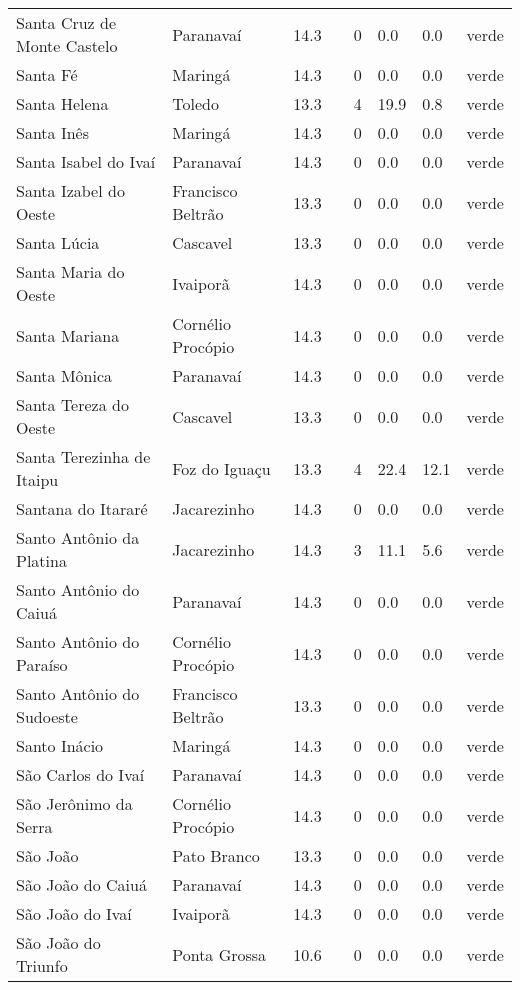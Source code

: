 \begin{longtable}{l|lllllll}
  Santa Cruz de Monte Castelo & Paranavaí & 14.3 &  & 0 & 0.0 & 0.0 & verde \\ 
  Santa Fé & Maringá & 14.3 &  & 0 & 0.0 & 0.0 & verde \\ 
  Santa Helena & Toledo & 13.3 &  & 4 & 19.9 & 0.8 & verde \\ 
  Santa Inês & Maringá & 14.3 &  & 0 & 0.0 & 0.0 & verde \\ 
  Santa Isabel do Ivaí & Paranavaí & 14.3 &  & 0 & 0.0 & 0.0 & verde \\ 
  Santa Izabel do Oeste & Francisco Beltrão & 13.3 &  & 0 & 0.0 & 0.0 & verde \\ 
  Santa Lúcia & Cascavel & 13.3 &  & 0 & 0.0 & 0.0 & verde \\ 
  Santa Maria do Oeste & Ivaiporã & 14.3 &  & 0 & 0.0 & 0.0 & verde \\ 
  Santa Mariana & Cornélio Procópio & 14.3 &  & 0 & 0.0 & 0.0 & verde \\ 
  Santa Mônica & Paranavaí & 14.3 &  & 0 & 0.0 & 0.0 & verde \\ 
  Santa Tereza do Oeste & Cascavel & 13.3 &  & 0 & 0.0 & 0.0 & verde \\ 
  Santa Terezinha de Itaipu & Foz do Iguaçu & 13.3 &  & 4 & 22.4 & 12.1 & verde \\ 
  Santana do Itararé & Jacarezinho & 14.3 &  & 0 & 0.0 & 0.0 & verde \\ 
  Santo Antônio da Platina & Jacarezinho & 14.3 &  & 3 & 11.1 & 5.6 & verde \\ 
  Santo Antônio do Caiuá & Paranavaí & 14.3 &  & 0 & 0.0 & 0.0 & verde \\ 
  Santo Antônio do Paraíso & Cornélio Procópio & 14.3 &  & 0 & 0.0 & 0.0 & verde \\ 
  Santo Antônio do Sudoeste & Francisco Beltrão & 13.3 &  & 0 & 0.0 & 0.0 & verde \\ 
  Santo Inácio & Maringá & 14.3 &  & 0 & 0.0 & 0.0 & verde \\ 
  São Carlos do Ivaí & Paranavaí & 14.3 &  & 0 & 0.0 & 0.0 & verde \\ 
  São Jerônimo da Serra & Cornélio Procópio & 14.3 &  & 0 & 0.0 & 0.0 & verde \\ 
  São João & Pato Branco & 13.3 &  & 0 & 0.0 & 0.0 & verde \\ 
  São João do Caiuá & Paranavaí & 14.3 &  & 0 & 0.0 & 0.0 & verde \\ 
  São João do Ivaí & Ivaiporã & 14.3 &  & 0 & 0.0 & 0.0 & verde \\ 
  São João do Triunfo & Ponta Grossa & 10.6 &  & 0 & 0.0 & 0.0 & verde \\ 

\end{longtable}
